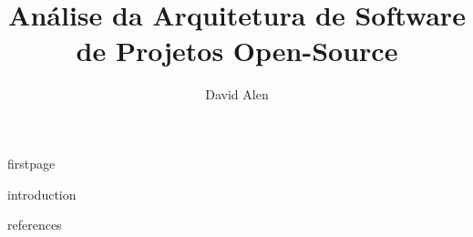 \documentclass[12pt]{article}
\title{Análise da Arquitetura de Software de Projetos Open-Source}
\author{David Alen\inst{1}}
\begin{document}
{firstpage}

{introduction}

{references}
\end{document}
